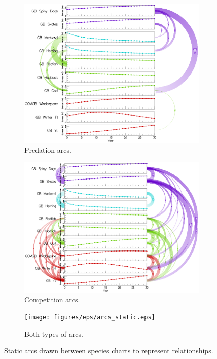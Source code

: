 \begin{figure}
\centering
	\begin{subfigure}[b]{0.33\textwidth}
		\centering
		\includegraphics[width=1\textwidth]{figures/eps/arcs_predation.eps}
		\caption{Predation arcs.}
		\label{fig:arcsPredation}
	\end{subfigure}	
	\begin{subfigure}[b]{0.33\textwidth}
		\centering
		\includegraphics[width=1\textwidth]{figures/eps/arcs_interaction.eps}
		\caption{Competition arcs.}
		\label{fig:arcsCompetition}
	\end{subfigure}
	\begin{subfigure}[b]{0.32\textwidth}
		\centering
		\texttt{[image: figures/eps/arcs\_static.eps]}
		\caption{Both types of arcs.}
		\label{fig:arcsBoth}
	\end{subfigure}
	\caption{Static arcs drawn between species charts to represent relationships.}
	\label{fig:betweenSpeciesArcs}
\end{figure}

